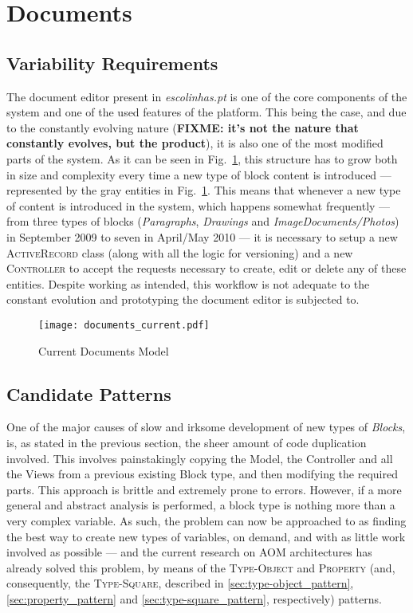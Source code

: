 \section{Documents}\label{sec:fa_documents}

\subsection{Variability Requirements}\label{sec:fa_documents_variability_requirements}

The document editor present in \emph{escolinhas.pt} is one of the core components of the system and one of the used features of the platform. This being the case, and due to the constantly evolving nature (\textbf{FIXME: it's not the nature that constantly evolves, but the product}), it is also one of the most modified parts of the system. As it can be seen in Fig.~\ref{fig:documents_current}, this structure has to grow both in size and complexity every time a new type of block content is introduced --- represented by the gray entities in Fig.~\ref{fig:documents_current}. This means that whenever a new type of content is introduced in the system, which happens somewhat frequently --- from three types of blocks (\emph{Paragraphs}, \emph{Drawings} and \emph{ImageDocuments/Photos}) in September 2009 to seven in April/May 2010 --- it is necessary to setup a new \textsc{ActiveRecord} class (along with all the logic for versioning) and a new \textsc{Controller} to accept the requests necessary to create, edit or delete any of these entities. Despite working as intended, this workflow is not adequate to the constant evolution and prototyping the document editor is subjected to.

\begin{figure}[H]
  \centering
  \texttt{[image: documents\_current.pdf]}
  \caption{Current Documents Model}
  \label{fig:documents_current}
\end{figure}

\subsection{Candidate Patterns}\label{sec:fa_documents_candidate_patterns}

One of the major causes of slow and irksome development of new types of \emph{Blocks}, is, as stated in the previous section, the sheer amount of code duplication involved. This involves painstakingly copying the Model, the Controller and all the Views from a previous existing Block type, and then modifying the required parts. This approach is brittle and extremely prone to errors. However, if a more general and abstract analysis is performed, a block type is nothing more than a very complex variable. As such, the problem can now be approached to as finding the best way to create new types of variables, on demand, and with as little work involved as possible --- and the current research on AOM architectures has already solved this problem, by means of the \textsc{Type-Object} and \textsc{Property} (and, consequently, the \textsc{Type-Square}, described in \ref{sec:type-object_pattern}, \ref{sec:property_pattern} and \ref{sec:type-square_pattern}, respectively) patterns.

